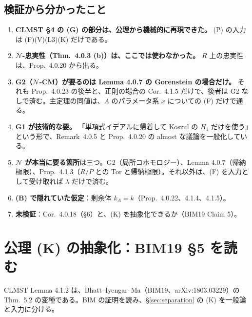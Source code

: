 \documentclass[11pt,a4paper]{ltjsarticle}
\theoremstyle{plain}
\theoremstyle{definition}
\theoremstyle{remark}
\theoremstyle{plain}
\begin{document}
\subsection{検証から分かったこと}
\begin{enumerate}
  \item \textbf{CLMST \S 4 の (G) の部分は、公理から機械的に再現できた。} (P) の入力は (F)(V)(L3)(K) だけである。
  \item \textbf{$\mathcal{N}$-忠実性（Thm.~4.0.3 (b)）は、ここでは使わなかった。} $R$ 上の忠実性は、Prop.~4.0.20 から出る。
  \item \textbf{G2（$\mathcal{N}$-CM）が要るのは Lemma 4.0.7 の Gorenstein の場合だけ。} それも Prop.~4.0.23 の後半と、正則の場合の Cor.~4.1.5 だけで、後者は G2 なしで済む。主定理の同値は、$A$ のパラメータ系 $x$ についての (F) だけで通る。
  \item \textbf{G1 が技術的な要。} 「単項式イデアルに帰着して Koszul の $H_1$ だけを使う」という形で、Remark~4.0.5 と Prop.~4.0.20 の almost な議論を一般化している。
  \item \textbf{$\mathcal{N}$ が本当に要る箇所}は三つ。G2（局所コホモロジー）、Lemma 4.0.7（帰納極限）、Prop.~4.1.3（$R/P$ との Tor と帰納極限）。それ以外は、(F) を入力として受け取れば $\lambda$ だけで済む。
  \item \textbf{(B) で隠れていた仮定}：剰余体 $k_A = k$（Prop.~4.0.22、4.1.4、4.1.5）。
  \item \textbf{未検証}：Cor.~4.0.18（\S 6）と、(K) を抽象化できるか（BIM19 Claim 5）。
\end{enumerate}

\section{公理 (K) の抽象化：BIM19 \S 5 を読む}\label{sec:K}

CLMST Lemma 4.1.2 は、Bhatt--Iyengar--Ma（BIM19、arXiv:1803.03229）の Thm.~5.2 の変種である。BIM の証明を読み、\S\ref{sec:separation} の (K) を一般論と入力に分ける。
\end{document}
